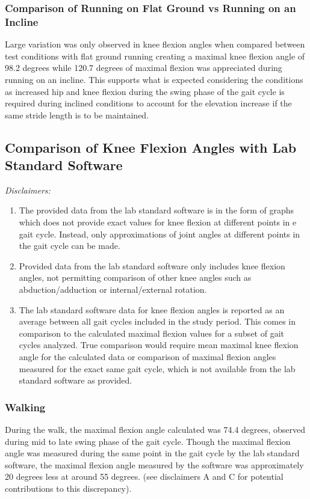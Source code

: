 \documentclass[10pt]{IEEEtran}
\begin{document}
    \subsubsection{Comparison of Running on Flat Ground vs Running on an Incline}
    Large variation was only observed in knee flexion angles when compared between test conditions with flat ground running creating a maximal knee flexion angle of 98.2 degrees while 120.7 degrees of maximal flexion was appreciated during running on an incline. This supports what is expected considering the conditions as increased hip and knee flexion during the swing phase of the gait cycle is required during inclined conditions to account for the elevation increase if the same stride length is to be maintained. 

    \subsection{Comparison of Knee Flexion Angles with Lab Standard Software}
    \emph{Disclaimers:}
    \begin{enumerate}
        \item The provided data from the lab standard software is in the form of graphs which does not provide exact values for knee flexion at different points in e gait cycle. Instead, only approximations of joint angles at different points in the gait cycle can be made. 
        \item Provided data from the lab standard software only includes knee flexion angles, not permitting comparison of other knee angles such as abduction/adduction or internal/external rotation. 
        \item The lab standard software data for knee flexion angles is reported as an average between all gait cycles included in the study period. This comes in comparison to the calculated maximal flexion values for a subset of gait cycles analyzed. True comparison would require mean maximal knee flexion angle for the calculated data or comparison of maximal flexion angles measured for the exact same gait cycle, which is not available from the lab standard software as provided. 
    \end{enumerate}

    \subsubsection{Walking}
    During the walk, the maximal flexion angle calculated was 74.4 degrees, observed during mid to late swing phase of the gait cycle. Though the maximal flexion angle was measured during the same point in the gait cycle by the lab standard software, the maximal flexion angle measured by the software was approximately 20 degrees less at around 55 degrees. (see disclaimers A and C for potential contributions to this discrepancy).
\end{document}
